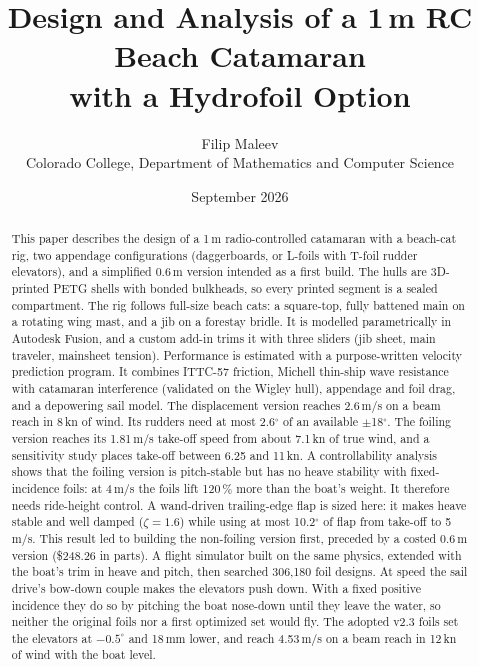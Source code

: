 \documentclass[10pt,twocolumn]{article}
\title{\textbf{Design and Analysis of a 1\,m RC Beach Catamaran\\ with a Hydrofoil Option}}
\author{Filip Maleev\\ \small Colorado College, Department of Mathematics and Computer Science}
\date{September 2026}
\begin{document}
\maketitle

\begin{abstract}
This paper describes the design of a 1\,m radio-controlled catamaran with a beach-cat rig, two appendage configurations (daggerboards, or L-foils with T-foil rudder elevators), and a simplified 0.6\,m version intended as a first build. The hulls are 3D-printed PETG shells with bonded bulkheads, so every printed segment is a sealed compartment. The rig follows full-size beach cats: a square-top, fully battened main on a rotating wing mast, and a jib on a forestay bridle. It is modelled parametrically in Autodesk Fusion, and a custom add-in trims it with three sliders (jib sheet, main traveler, mainsheet tension). Performance is estimated with a purpose-written velocity prediction program. It combines ITTC-57 friction, Michell thin-ship wave resistance with catamaran interference (validated on the Wigley hull), appendage and foil drag, and a depowering sail model. The displacement version reaches 2.6\,m/s on a beam reach in 8\,kn of wind. Its rudders need at most 2.6$^\circ$ of an available $\pm$18$^\circ$. The foiling version reaches its 1.81\,m/s take-off speed from about 7.1\,kn of true wind, and a sensitivity study places take-off between 6.25 and 11\,kn. A controllability analysis shows that the foiling version is pitch-stable but has no heave stability with fixed-incidence foils: at 4\,m/s the foils lift 120\,\% more than the boat's weight. It therefore needs ride-height control. A wand-driven trailing-edge flap is sized here: it makes heave stable and well damped ($\zeta=1.6$) while using at most 10.2$^\circ$ of flap from take-off to 5\,m/s. This result led to building the non-foiling version first, preceded by a costed 0.6\,m version (\$248.26 in parts). A flight simulator built on the same physics, extended with the boat's trim in heave and pitch, then searched 306{,}180 foil designs. At speed the sail drive's bow-down couple makes the elevators push down. With a fixed positive incidence they do so by pitching the boat nose-down until they leave the water, so neither the original foils nor a first optimized set would fly. The adopted v2.3 foils set the elevators at $-0.5^\circ$ and 18\,mm lower, and reach 4.53\,m/s on a beam reach in 12\,kn of wind with the boat level.
\end{abstract}
\end{document}
